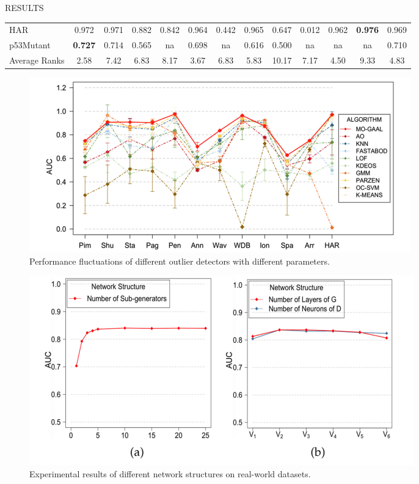 \documentclass[final]{beamer}
\newlength{\colwidth}
\begin{document}
\begin{frame}[t]
\begin{columns}[t]
\begin{column}{\colwidth}
\begin{block}{RESULTS}
\begin{table}
{\begin{tabular}{lcccccccccccc}
        HAR & 0.972 & 0.971 & 0.882 & 0.842 & 0.964 & 0.442 & 0.965 & 0.647 & 0.012 & 0.962 & \textbf{0.976} & 0.969 \\
        p53Mutant & \textbf{0.727} & 0.714 & 0.565 & na & 0.698 & na & 0.616 & 0.500 & na & na & na & 0.710 \\
        Average Ranks & 2.58 & 7.42 & 6.83 & 8.17 & 3.67 & 6.83 & 5.83 & 10.17 & 7.17 & 4.50 & 9.33 & 4.83 \\ 
        \bottomrule
      \end{tabular}}
  	  \label{table:result}
    \end{table}
	
	 \begin{figure}
		\centering
		\includegraphics[scale=2]{figures/Result.png}
		\caption{Performance fluctuations of different outlier detectors with different parameters.}
	\end{figure}
	
	\begin{figure}
		\centering
		\includegraphics[scale=1.8]{figures/Result 2.png}
		\caption{Experimental results of different network structures on real-world datasets.}
	\end{figure}


\end{block}
\end{column}
\end{columns}
\end{frame}
\end{document}
